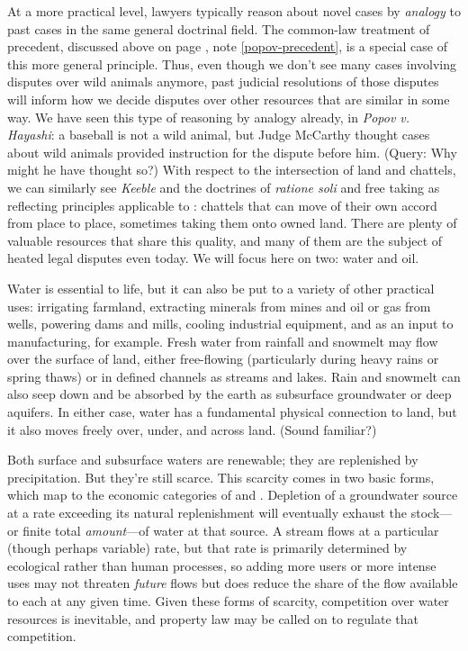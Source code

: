 At a more practical level, lawyers typically reason about novel cases by
\textit{analogy} to past cases in the same general doctrinal field. The
common-law treatment of precedent, discussed above on page
\pageref{popov-precedent}, note \ref{popov-precedent}, is a special case of
this more general principle. Thus, even though we don't see many cases involving
disputes over wild animals anymore, past judicial resolutions of those disputes
will inform how we decide disputes over other resources that are similar in some
way. We have seen this type of reasoning by analogy already, in \textit{Popov v.
Hayashi}: a baseball is not a wild animal, but Judge McCarthy thought cases
about wild animals provided instruction for the dispute before him. (Query: Why
might he have thought so?) With respect to the intersection of land and
chattels, we can similarly see \textit{Keeble} and the doctrines of
\textit{ratione soli} and free taking as reflecting principles applicable to
: chattels that can move of their own accord from
place to place, sometimes taking them onto owned land. There are plenty of
valuable resources that share this quality, and many of them are the subject of
heated legal disputes even today. We will focus here on two: water and oil.

Water is essential to life, but it can also be put to a variety of other
practical uses: irrigating farmland, extracting minerals from mines and oil or
gas from wells, powering dams and mills, cooling industrial equipment, and as an
input to manufacturing, for example. Fresh water from rainfall and snowmelt may
flow over the surface of land, either free-flowing (particularly during heavy
rains or spring thaws) or in defined channels as streams and lakes. Rain and
snowmelt can also seep down and be absorbed by the earth as subsurface
groundwater or deep aquifers. In either case, water has a fundamental physical
connection to land, but it also moves freely over, under, and across land.
(Sound familiar?)

Both surface and subsurface waters are renewable; they are replenished by
precipitation. But they're still scarce. This scarcity comes in two basic forms,
which map to the economic categories of  and .
Depletion of a groundwater source at a rate exceeding its natural replenishment
will eventually exhaust the stock---or finite total
\textit{amount}---of water at that source. A stream flows at a
particular (though perhaps variable) rate, but that rate is primarily
determined by ecological rather than human processes, so adding more users or
more intense uses may not threaten \textit{future} flows but does reduce the
share of the flow available to each at any given time. Given these forms of
scarcity, competition over water resources is inevitable, and property law may
be called on to regulate that competition.

